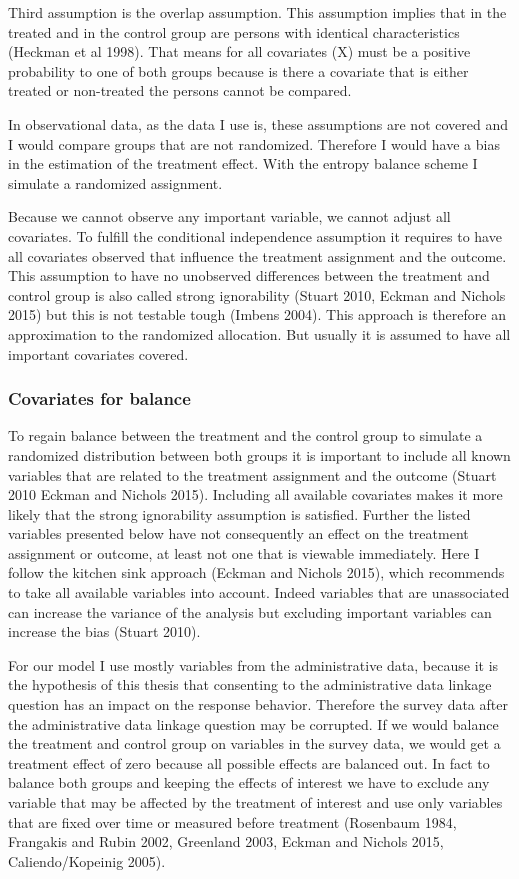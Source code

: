 Third assumption is the overlap assumption. This assumption implies that in the treated and in the control group are persons with identical characteristics (Heckman et al 1998). That means for all covariates (X) must be a positive probability to one of both groups because is there a covariate that is either treated or non-treated the persons cannot be compared. 

In observational data, as the data I use is, these assumptions are not covered and I would compare groups that are not randomized. Therefore I would have a bias in the estimation of the treatment effect. With the entropy balance scheme I simulate a randomized assignment. 

Because we cannot observe any important variable, we cannot adjust all covariates. To fulfill the conditional independence assumption it requires to have all covariates observed that influence the treatment assignment and the outcome. This assumption to have no unobserved differences between the treatment and control group is also called strong ignorability (Stuart 2010, Eckman and Nichols 2015) but this is not testable tough (Imbens 2004). This approach is therefore an approximation to the randomized allocation. But usually it is assumed to have all important covariates covered. 

\subsubsection{Covariates for balance}\label{covar}

To regain balance between the treatment and the control group to simulate a randomized distribution between both groups it is important to include all known variables that are related to the treatment assignment and the outcome (Stuart 2010 Eckman and Nichols 2015). Including all available covariates makes it more likely that the strong ignorability assumption is satisfied. Further the listed variables presented below have not consequently an effect on the treatment assignment or outcome, at least not one that is viewable immediately. Here I follow the kitchen sink approach (Eckman and Nichols 2015), which recommends to take all available variables into account. Indeed variables that are unassociated can increase the variance of the analysis but excluding important variables can increase the bias (Stuart 2010). 

For our model I use mostly variables from the administrative data, because it is the hypothesis of this thesis that consenting to the administrative data linkage question has an impact on the response behavior. Therefore the survey data after the administrative data linkage question may be corrupted. If we would balance the treatment and control group on variables in the survey data, we would get a treatment effect of zero because all possible effects are balanced out. In fact to balance both groups and keeping the effects of interest we have to exclude any variable that may be affected by the treatment of interest and use only variables that are fixed over time or measured before treatment (Rosenbaum 1984, Frangakis and Rubin 2002, Greenland 2003, Eckman and Nichols 2015, Caliendo/Kopeinig 2005).

